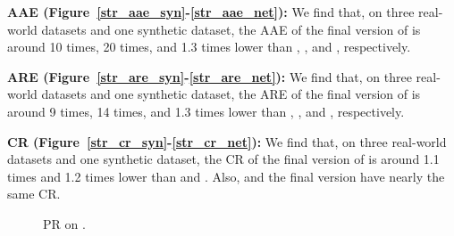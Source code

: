 			
\noindent\textbf{AAE (Figure~\ref{str_aae_syn}-\ref{str_aae_net}):}
We find that, on three real-world datasets and one synthetic dataset, the AAE of the final version of \sketchname{} is around 10 times, 20 times, and 1.3 times lower than \secmin, \secss, and \secarr, respectively. 
			
			
\noindent\textbf{ARE (Figure~\ref{str_are_syn}-\ref{str_are_net}):}
We find that, on three real-world datasets and one synthetic dataset, the ARE of the final version of \sketchname{} is around 9 times, 14 times, and 1.3 times lower than \secmin, \secss, and \secarr, respectively. 
			
			
\noindent\textbf{CR (Figure~\ref{str_cr_syn}-\ref{str_cr_net}):}
We find that, on three real-world datasets and one synthetic dataset, the CR of the final version of \sketchname{} is around 1.1 times and 1.2 times lower than \secmin{} and \secss. Also, \secarr{} and the final version have nearly the same CR. 

\begin{figure*}[!ht]
	\centering

			
				\caption{PR on \taskpara.}
				\label{str_pr}
				
			\end{figure*}
			
